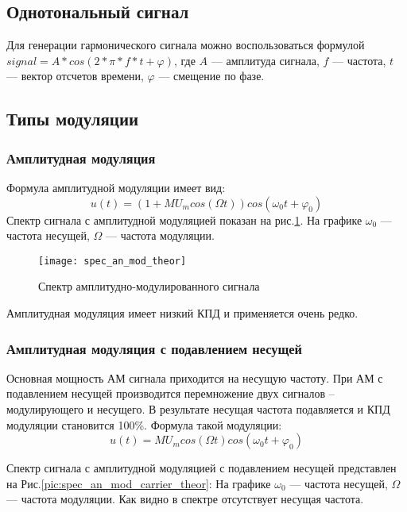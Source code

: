 \subsection{Однотональный сигнал}

Для генерации гармонического сигнала можно воспользоваться формулой\\ $signal = A*cos(2*\pi * f*t + \varphi)$,
 где $ A $ --- амплитуда сигнала, $f$ --- частота, $t$ --- вектор отсчетов времени, $\varphi$ --- смещение по фазе.

\subsection{Типы модуляции}
\subsubsection{Амплитудная модуляция}
Формула амплитудной модуляции имеет вид: 
\begin{equation}
	u(t) = (1 + M U_m cos(\Omega t)) cos(\omega_0 t + \varphi _0)
\end{equation}
Спектр сигнала с амплитудной модуляцией показан на рис.\ref{pic:spec_an_mod_theor}.
На графике $\omega_0$ --- частота несущей, $\Omega$ --- частота модуляции.
\begin{figure}[H]
	\begin{center}
		\texttt{[image: spec\_an\_mod\_theor]}
		\caption{Спектр амплитудно-модулированного сигнала} 
		\label{pic:spec_an_mod_theor} %
	\end{center}
\end{figure}

Амплитудная модуляция имеет низкий КПД и применяется очень редко.

\subsubsection{Амплитудная модуляция с подавлением несущей}
Основная мощность АМ сигнала приходится на несущую частоту. При АМ с подавлением несущей производится перемножение двух сигналов – модулирующего и несущего. В результате несущая частота подавляется и КПД модуляции становится 100\%.
Формула такой модуляции:
\begin{equation}
	u(t) = M U_m cos(\Omega t) cos(\omega_0 t + \varphi _0)
\end{equation}

Спектр сигнала с амплитудной модуляцией с подавлением несущей представлен на Рис.\ref{pic:spec_an_mod_carrier_theor}:
На графике $\omega_0$ --- частота несущей, $\Omega$ --- частота модуляции. Как видно в спектре
отсутствует несущая частота. 

